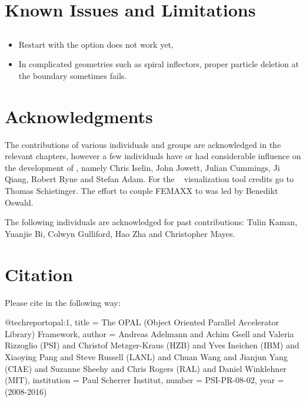 \section{Known Issues and Limitations}
\subsection{\opalcycl}
\begin{itemize}
    \item Restart with the option  does not work yet,
    \item In complicated geometries such as spiral inflectors, proper particle deletion at the boundary sometimes fails.
\end{itemize}
\section{Acknowledgments}
The contributions of various individuals and groups are acknowledged in the relevant chapters, however a few individuals have or had considerable influence on the
development of \opal, namely Chris Iselin, John Jowett, Julian Cummings, Ji Qiang, Robert Ryne and Stefan Adam. For the \partroot~ visualization tool credits go to Thomas Schietinger.
The effort to couple FEMAXX to \opal was led by Benedikt Oswald.

The following
individuals are acknowledged for past contributions: Tulin Kaman, Yuanjie Bi, Colwyn Gulliford, Hao Zha and Christopher Mayes.

\section{Citation}
Please cite \opal in the following way:
\begin{example}
@techreport{opal:1,
title = {The OPAL (Object Oriented Parallel Accelerator Library) Framework},
author = {Andreas Adelmann and Achim Gsell and Valeria Rizzoglio (PSI) and Christof
Metzger-Kraus (HZB) and Yves Ineichen (IBM) and Xiaoying Pang and Steve Russell (LANL)
and Chuan Wang and Jianjun Yang (CIAE) and Suzanne Sheehy and Chris Rogers (RAL) and
Daniel Winklehner (MIT)},
institution = {Paul Scherrer Institut},
number = {PSI-PR-08-02},
year = {(2008-2016)}
}
\end{example}



